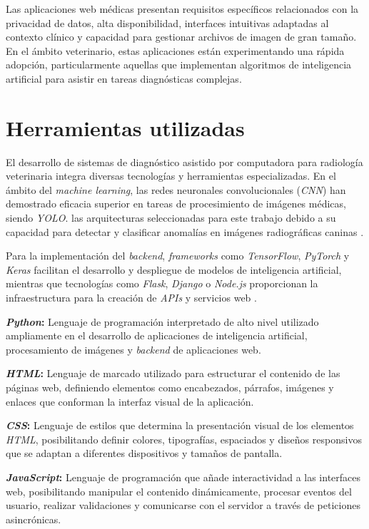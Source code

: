 {Las aplicaciones web médicas presentan requisitos específicos relacionados con la privacidad de datos, alta disponibilidad, interfaces intuitivas adaptadas al contexto clínico y capacidad para gestionar archivos de imagen de gran tamaño. En el ámbito veterinario, estas aplicaciones están experimentando una rápida adopción, particularmente aquellas que implementan algoritmos de inteligencia artificial para asistir en tareas diagnósticas complejas.

\section{Herramientas utilizadas}
El desarrollo de sistemas de diagnóstico asistido por computadora para radiología veterinaria integra diversas tecnologías y herramientas especializadas. En el ámbito del \textit{machine learning}, las redes neuronales convolucionales (\textit{CNN}) han demostrado eficacia superior en tareas de procesimiento de imágenes médicas, siendo \textit{YOLO}.  las arquitecturas seleccionadas para este trabajo debido a su capacidad para detectar y clasificar anomalías en imágenes radiográficas caninas \cite{jocher2023yolo}.

Para la implementación del \textit{backend}, \textit{frameworks} como \textit{TensorFlow}, \textit{PyTorch} y \textit{Keras} facilitan el desarrollo y despliegue de modelos de inteligencia artificial, mientras que tecnologías como \textit{Flask}, \textit{Django} o \textit{Node.js} proporcionan la infraestructura para la creación de \textit{APIs} y servicios web \cite{howard2020deep}.

\textbf{\textit{Python}:} Lenguaje de programación interpretado de alto nivel utilizado ampliamente en el desarrollo de aplicaciones de inteligencia artificial, procesamiento de imágenes y \textit{backend} de aplicaciones web.

\textbf{\textit{HTML}:} Lenguaje de marcado utilizado para estructurar el contenido de las páginas web, definiendo elementos como encabezados, párrafos, imágenes y enlaces que conforman la interfaz visual de la aplicación.

\textbf{\textit{CSS}:} Lenguaje de estilos que determina la presentación visual de los elementos \textit{HTML}, posibilitando definir colores, tipografías, espaciados y diseños responsivos que se adaptan a diferentes dispositivos y tamaños de pantalla.

\textbf{\textit{JavaScript}:} Lenguaje de programación que añade interactividad a las interfaces web, posibilitando manipular el contenido dinámicamente, procesar eventos del usuario, realizar validaciones y comunicarse con el servidor a través de peticiones asincrónicas.

}

